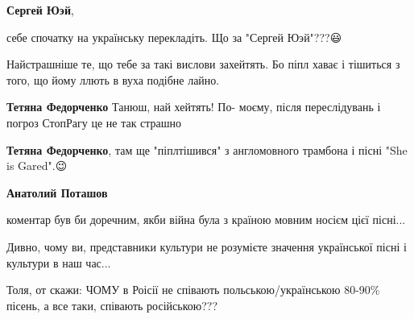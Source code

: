 \begin{itemize}
\begin{itemize}
\begin{itemize}
\textbf{Сергей Юэй}, 

себе спочатку на українську перекладіть. Що за "Сергей Юэй"???😃

\end{itemize}

\end{itemize}

 
Найстрашніше те, що тебе за такі вислови захейтять. Бо піпл хаває і тішиться з
того, що йому ллють в вуха подібне лайно.

\begin{itemize}
 
\textbf{Тетяна Федорченко} Танюш, най хейтять!
По- моєму, після переслідувань і погроз СтопРагу це не так страшно

 
\textbf{Тетяна Федорченко}, там ще "піплтішився" з англомовного трамбона і пісні "She is Gared".😉\Laughey[1.0][white]

\begin{itemize}
 
\textbf{Анатолий Поташов} 

коментар був би доречним, якби війна була з країною мовним носієм цієї пісні...

Дивно, чому ви, представники культури не розумієте значення української пісні і
культури в наш час...

Толя, от скажи: ЧОМУ в Роісії не співають польською/українською 80-90\% пісень,
а все таки, співають російською???


\end{itemize}
\end{itemize}
\end{itemize}
